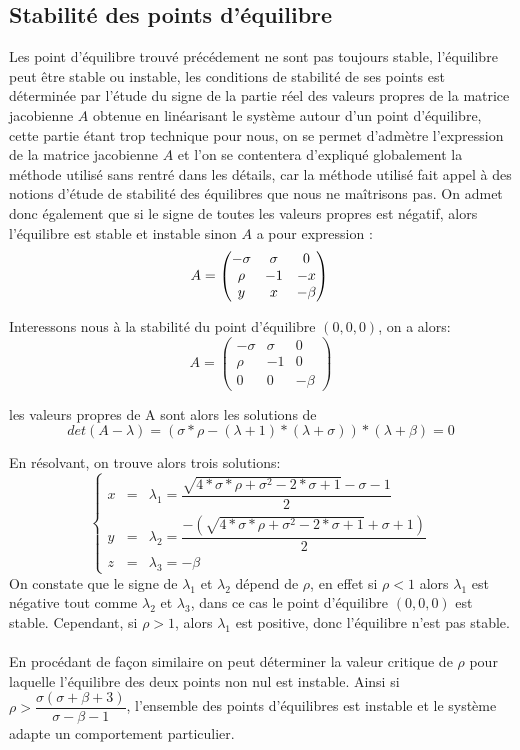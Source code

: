 \subsection{Stabilité des points d'équilibre}
Les point d'équilibre trouvé précédement ne sont pas toujours stable, l'équilibre peut être stable ou instable, les conditions de stabilité de ses points est déterminée par l'étude du signe de la partie réel des valeurs propres de la matrice jacobienne $A$ obtenue en linéarisant le système autour d'un point d'équilibre, cette partie étant trop technique pour nous, on se permet d'admètre l'expression de la matrice jacobienne $A$ et l'on se contentera d'expliqué globalement la méthode utilisé sans rentré dans les détails, car la méthode utilisé fait appel à des notions d'étude de stabilité des équilibres que nous ne maîtrisons pas. On admet donc également que si le signe de toutes les valeurs propres est négatif, alors l'équilibre est stable et instable sinon
$A$ a pour expression :
$$A=\begin{pmatrix}
    -\sigma & \sigma & 0\\
    \rho & -1 & -x\\
       y & x & -\beta 
\end{pmatrix}\\\\$$

Interessons nous à la stabilité du point d'équilibre $(0,0,0)$, on a alors:
$$A=\begin{pmatrix}
    -\sigma & \sigma & 0\\
    \rho & -1 & 0\\
       0 & 0 & -\beta 
\end{pmatrix}$$

les valeurs propres de A sont alors les solutions de
$$det(A-\lambda)=(\sigma*\rho-(\lambda+1)*(\lambda+\sigma))*(\lambda+\beta)=0$$

En résolvant, on trouve alors trois solutions: 
\[
    \left\{
    \begin{array}{rcl}
        x&=& \lambda_{1}=\dfrac{\sqrt{4*\sigma*\rho+\sigma^2-2*\sigma+1}-\sigma-1}{2}\\[12pt]
        y&=& \lambda_{2}=\dfrac{-(\sqrt{4*\sigma*\rho+\sigma^2-2*\sigma+1}+\sigma+1)}{2}\\[12pt]
        z&=& \lambda_{3}=-\beta
    \end{array}
    \right.
\]
On constate que le signe de  $\lambda_{1}$ et $\lambda_{2}$ dépend de $\rho$, en effet si $\rho<1$ alors $\lambda_{1}$ est négative tout comme $\lambda_{2}$ et $\lambda_{3}$, dans ce cas le point d'équilibre $(0,0,0)$ est stable. Cependant, si $\rho>1$, alors $\lambda_{1}$ est positive, donc l'équilibre n'est pas stable.\\\\
En procédant de façon similaire on peut déterminer la valeur critique de $\rho$ pour laquelle l'équilibre des deux points non nul est instable. Ainsi si $\rho > \dfrac{\sigma(\sigma+\beta+3)}{\sigma-\beta-1}$, l'ensemble des points d'équilibres est instable et le système adapte un comportement particulier.

